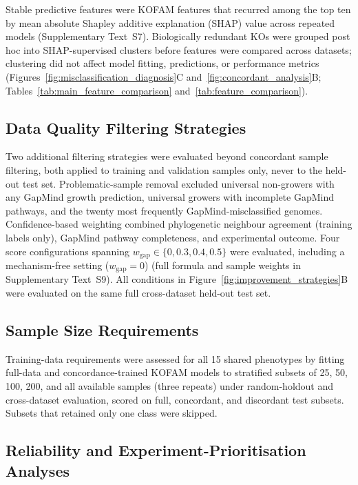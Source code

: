 Stable predictive features were KOFAM features that recurred among the top ten by mean absolute Shapley additive explanation (SHAP) value across repeated models (Supplementary Text~S7).
Biologically redundant KOs were grouped post hoc into SHAP-supervised clusters before features were compared across datasets; clustering did not affect model fitting, predictions, or performance metrics (Figures~\ref{fig:misclassification_diagnosis}C and~\ref{fig:concordant_analysis}B; Tables~\ref{tab:main_feature_comparison} and~\ref{tab:feature_comparison}).

\subsection*{Data Quality Filtering Strategies}

Two additional filtering strategies were evaluated beyond concordant sample filtering, both applied to training and validation samples only, never to the held-out test set.
Problematic-sample removal excluded universal non-growers with any GapMind growth prediction, universal growers with incomplete GapMind pathways, and the twenty most frequently GapMind-misclassified genomes.
Confidence-based weighting combined phylogenetic neighbour agreement (training labels only), GapMind pathway completeness, and experimental outcome.
Four score configurations spanning $w_{\mathrm{gap}} \in \{0, 0.3, 0.4, 0.5\}$ were evaluated, including a mechanism-free setting ($w_{\mathrm{gap}} = 0$) (full formula and sample weights in Supplementary Text~S9).
All conditions in Figure~\ref{fig:improvement_strategies}B were evaluated on the same full cross-dataset held-out test set.

\subsection*{Sample Size Requirements}

Training-data requirements were assessed for all 15 shared phenotypes by fitting full-data and concordance-trained KOFAM models to stratified subsets of 25, 50, 100, 200, and all available samples (three repeats) under random-holdout and cross-dataset evaluation, scored on full, concordant, and discordant test subsets.
Subsets that retained only one class were skipped.

\subsection*{Reliability and Experiment-Prioritisation Analyses}

